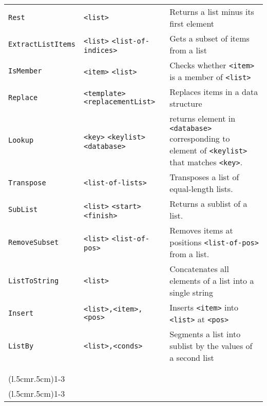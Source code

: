\begin{longtable}{p{3cm}p{3cm}p{6cm}}
\verb+Rest+ & \verb+<list>+& Returns a list minus its first element\\
\verb+ExtractListItems+ &\verb+<list>+ \verb+<list-of-indices>+ & Gets a subset of items from a list\\ 
\verb+IsMember+ &\verb+<item>+ \verb+<list>+ & Checks whether \verb+<item>+ is a member of \verb+<list>+ \\ 
\verb+Replace+ &\verb+<template>+ \verb+<replacementList>+ & Replaces items in a data structure\\ 
\verb+Lookup+& \verb+<key>+ \verb+<keylist>+ \verb+<database>+&returns
element in \verb+<database>+ corresponding to element of
\verb+<keylist>+ that matches \verb+<key>+.\\
\verb+Transpose+ &\verb+<list-of-lists>+ &Transposes a list of equal-length lists.\\ 
\verb+SubList+ &\verb+<list>+ \verb+<start>+ \verb+<finish>+ & Returns a sublist of a list.\\ 
\verb+RemoveSubset+ &\verb+<list>+ \verb+<list-of-pos>+ & Removes items at positions \verb+<list-of-pos>+ from a list.\\ 
\verb+ListToString+ &\verb+<list>+ & Concatenates all elements of a list into a single string\\
\verb+Insert+ & \verb+<list>,<item>,<pos>+ & Inserts \verb+<item>+ into \verb+<list>+ at \verb+<pos>+\\
\verb+ListBy+ & \verb+<list>,<conds>+ &Segments a list into sublist by the values of a second list\\
\\
\\
\addlinespace[0.2cm] 
\cmidrule(l{.5cm}r{.5cm}){1-3} 
\multicolumn{3}{c}{\textbf{String Management Functions}}\\ 
\cmidrule(l{.5cm}r{.5cm}){1-3} 


\end{longtable}
